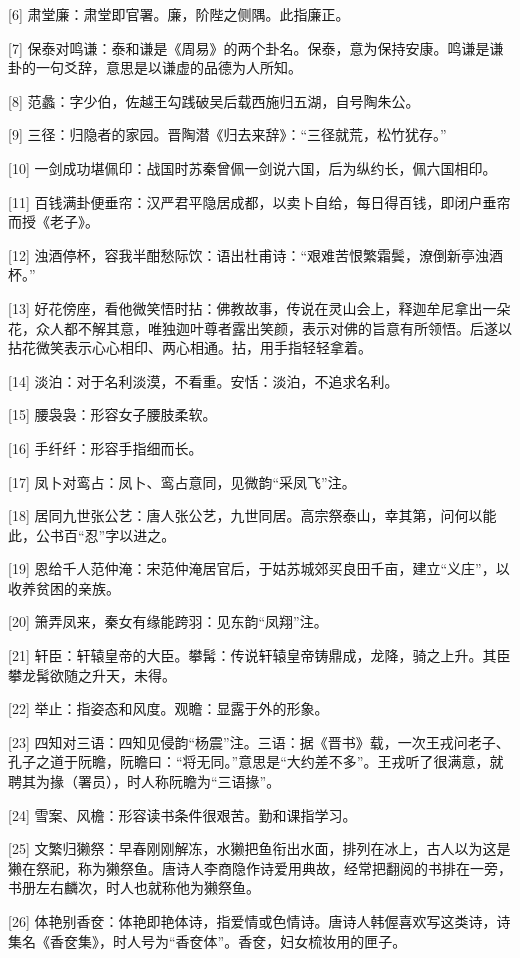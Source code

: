 \documentclass[12pt,UTF8]{ctexbook}
\begin{document}
[6] 肃堂廉：肃堂即官署。廉，阶陛之侧隅。此指廉正。

[7] 保泰对鸣谦：泰和谦是《周易》的两个卦名。保泰，意为保持安康。鸣谦是谦卦的一句爻辞，意思是以谦虚的品德为人所知。

[8] 范蠡：字少伯，佐越王勾践破吴后载西施归五湖，自号陶朱公。

[9] 三径：归隐者的家园。晋陶潜《归去来辞》：“三径就荒，松竹犹存。”

[10] 一剑成功堪佩印：战国时苏秦曾佩一剑说六国，后为纵约长，佩六国相印。

[11] 百钱满卦便垂帘：汉严君平隐居成都，以卖卜自给，每日得百钱，即闭户垂帘而授《老子》。

[12] 浊酒停杯，容我半酣愁际饮：语出杜甫诗：“艰难苦恨繁霜鬓，潦倒新亭浊酒杯。”

[13] 好花傍座，看他微笑悟时拈：佛教故事，传说在灵山会上，释迦牟尼拿出一朵花，众人都不解其意，唯独迦叶尊者露出笑颜，表示对佛的旨意有所领悟。后遂以拈花微笑表示心心相印、两心相通。拈，用手指轻轻拿着。

[14] 淡泊：对于名利淡漠，不看重。安恬：淡泊，不追求名利。

[15] 腰袅袅：形容女子腰肢柔软。

[16] 手纤纤：形容手指细而长。

[17] 凤卜对鸾占：凤卜、鸾占意同，见微韵“采凤飞”注。

[18] 居同九世张公艺：唐人张公艺，九世同居。高宗祭泰山，幸其第，问何以能此，公书百“忍”字以进之。

[19] 恩给千人范仲淹：宋范仲淹居官后，于姑苏城郊买良田千亩，建立“义庄”，以收养贫困的亲族。

[20] 箫弄凤来，秦女有缘能跨羽：见东韵“凤翔”注。

[21] 轩臣：轩辕皇帝的大臣。攀髯：传说轩辕皇帝铸鼎成，龙降，骑之上升。其臣攀龙髯欲随之升天，未得。

[22] 举止：指姿态和风度。观瞻：显露于外的形象。

[23] 四知对三语：四知见侵韵“杨震”注。三语：据《晋书》载，一次王戎问老子、孔子之道于阮瞻，阮瞻曰：“将无同。”意思是“大约差不多”。王戎听了很满意，就聘其为掾（署员），时人称阮瞻为“三语掾”。

[24] 雪案、风檐：形容读书条件很艰苦。勤和课指学习。

[25] 文繁归獭祭：早春刚刚解冻，水獭把鱼衔出水面，排列在冰上，古人以为这是獭在祭祀，称为獭祭鱼。唐诗人李商隐作诗爱用典故，经常把翻阅的书排在一旁，书册左右麟次，时人也就称他为獭祭鱼。

[26] 体艳别香奁：体艳即艳体诗，指爱情或色情诗。唐诗人韩偓喜欢写这类诗，诗集名《香奁集》，时人号为“香奁体”。香奁，妇女梳妆用的匣子。
\end{document}
